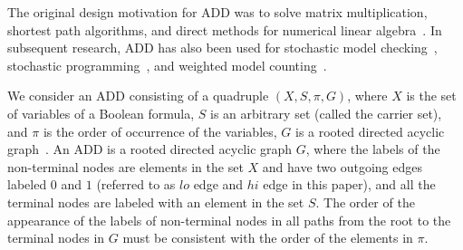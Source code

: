 The original design motivation for ADD was to solve matrix multiplication, shortest path algorithms, and direct methods for numerical linear algebra~\cite{bahar1997algebric}.
In subsequent research, ADD has also been used for stochastic model checking~\cite{kwiatkowska2007stochastic}, stochastic programming~\cite{hoey2013spudd}, and weighted model counting~\cite{dudek2020addmc}.

We consider an ADD consisting of a quadruple $(X,S,\pi,G)$, where $X$ is the set of variables of a Boolean formula, $S$ is an arbitrary set (called the carrier set), and $\pi$ is the order of occurrence of the variables, $G$ is a rooted directed acyclic graph~\cite{dudek2020addmc}.
An ADD is a rooted directed acyclic graph $G$, where the labels of the non-terminal nodes are elements in the set $X$ and have two outgoing edges labeled $0$ and $1$ (referred to as $lo$ edge and $hi$ edge in this paper), and all the terminal nodes are labeled with an element in the set $S$.
The order of the appearance of the labels of non-terminal nodes in all paths from the root to the terminal nodes in $G$ must be consistent with the order of the elements in $\pi$.



